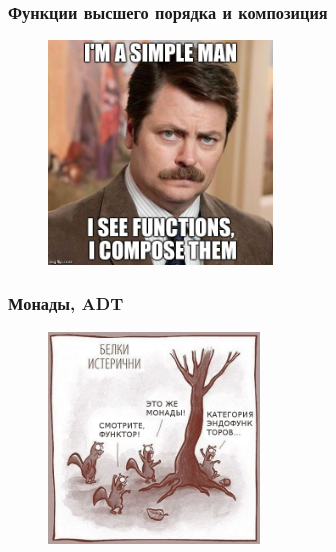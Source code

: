 \documentclass[18pt, compress, aspectratio=169]{beamer}
\begin{document}
\begin{frame}
    \frametitle{Функции высшего порядка и композиция}
    \vspace{-25pt}
    \begin{figure}
        \includegraphics[width=0.53\textwidth,center]{function_composition.jpg}
    \end{figure}
\end{frame}

\begin{frame}
    \frametitle{Монады, ADT}
    \vspace{-20pt}
    \begin{figure}
        \includegraphics[width=0.5\textwidth,center]{squirells.png}
    \end{figure}
\end{frame}
\end{document}
